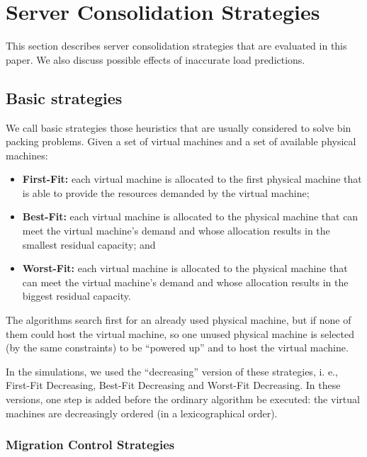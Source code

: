 \section{Server Consolidation Strategies}
\label{sec:server_consolidation_strategies}

This section describes server consolidation strategies that are evaluated in this paper. We also discuss possible effects of inaccurate load predictions.

\subsection{Basic strategies}

We call basic strategies those heuristics that are usually considered to solve bin packing problems. Given a set of virtual machines and a set of available physical machines:

\begin{itemize}
	\item \textbf{First-Fit:}
		each virtual machine is allocated to the first physical machine that is able to provide the resources demanded by the virtual machine;
		
	\item \textbf{Best-Fit:}
		each virtual machine is allocated to the physical machine that can meet the virtual machine's demand and whose allocation results in the smallest residual capacity; and

	\item \textbf{Worst-Fit:}
		each virtual machine is allocated to the physical machine that can meet the virtual machine's demand and whose allocation results in the biggest residual capacity.
\end{itemize}

The algorithms search first for an already used physical machine, but if none of them could host the virtual machine, so one unused physical machine is selected (by the same constraints) to be ``powered up'' and to host the virtual machine.

In the simulations, we used the ``decreasing'' version of these strategies, i. e., First-Fit Decreasing, Best-Fit Decreasing and Worst-Fit Decreasing. In these versions, one step is added before the ordinary algorithm be executed: the virtual machines are decreasingly ordered (in a lexicographical order).

\subsubsection*{Migration Control Strategies}

